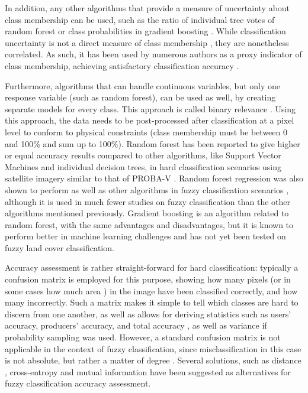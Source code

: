 \documentclass[a4paper,10pt]{book}
\begin{document}
In addition, any other algorithms that provide a measure of uncertainty about class membership can be used, such as the ratio of individual tree votes of random forest \citep{breiman2001random} or class probabilities in gradient boosting \citep{friedman2001gradientboost}. While classification uncertainty is not a direct measure of class membership \citep{sytze2000fuzzyset}, they are nonetheless correlated. As such, it has been used by numerous authors as a proxy indicator of class membership, achieving satisfactory classification accuracy \citep{foody2002accuracy}.

Furthermore, algorithms that can handle continuous variables, but only one response variable (such as random forest), can be used as well, by creating separate models for every class. This approach is called binary relevance \citep{karalas2016br}. Using this approach, the data needs to be post-processed after classification at a pixel level to conform to physical constraints (class membership must be between 0 and 100\% and sum up to 100\%). Random forest has been reported to give higher or equal accuracy results compared to other algorithms, like Support Vector Machines and individual decision trees, in hard classification scenarios using satellite imagery similar to that of PROBA-V \citep{duro2012algorithmcomparison}. Random forest regression was also shown to perform as well as other algorithms in fuzzy classification scenarios \citep{walton2008subpixelrf}, although it is used in much fewer studies on fuzzy classification than the other algorithms mentioned previously. Gradient boosting is an algorithm related to random forest, with the same advantages and disadvantages, but it is known to perform better in machine learning challenges \citep{chen2015higgs} and has not yet been tested on fuzzy land cover classification.

Accuracy assessment is rather straight-forward for hard classification: typically a confusion matrix is employed for this purpose, showing how many pixels (or in some cases how much area \citep{stehman2009sampling}) in the image have been classified correctly, and how many incorrectly. Such a matrix makes it simple to tell which classes are hard to discern from one another, as well as allows for deriving statistics such as users' accuracy, producers' accuracy, and total accuracy \citep{foody1996fuzzyevaluation}, as well as variance if probability sampling was used. However, a standard confusion matrix is not applicable in the context of fuzzy classification, since misclassification in this case is not absolute, but rather a matter of degree \citep{foody2002accuracy}. Several solutions, such as distance \citep{foody1996fuzzyevaluation}, cross-entropy and mutual information \citep{lu2007methods} have been suggested as alternatives for fuzzy classification accuracy assessment.
\end{document}
